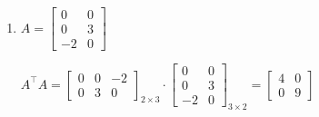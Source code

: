 \begin{enumerate}[label=\color{red}\textbf{\arabic*)}, leftmargin=*]
\begin{enumerate}[label=\color{red}\alph*)]
		$u_1=\dfrac{1}{\sigma_1}Av_1=\dfrac{1}{9}\begin{bmatrix}
			3 & 8\\
			0 & 3
		\end{bmatrix}\cdot\begin{bmatrix}
		\dfrac{1}{\sqrt{10}}\\
		\dfrac{3}{\sqrt{10}}
		\end{bmatrix}=\dfrac{1}{9\sqrt{10}}\cdot\begin{bmatrix}
		27\\
		9
		\end{bmatrix}=\dfrac{1}{\sqrt{10}}\begin{bmatrix}
		3\\
		1
		\end{bmatrix}$
		
		$u_2=\dfrac{1}{\sigma_2}Av_2=\dfrac{1}{\sqrt{10}}\begin{bmatrix}
			3 & 8\\
			0 & 3
		\end{bmatrix}\cdot\begin{bmatrix}
		-3\\
		1
		\end{bmatrix}=\dfrac{1}{\sqrt{10}}\cdot\begin{bmatrix}
		-1\\
		3
		\end{bmatrix}$
		
		$\bboxed{A=U\Sigma V^\intercal}$
	\end{enumerate}
	\item {}
	
	$A= \begin{bmatrix}
		0 & 0\\
		0 & 3\\
		-2 & 0
	\end{bmatrix}$
	
	$A^\intercal A=\begin{bmatrix}
		0 & 0 & -2\\
		0 & 3 & 0
	\end{bmatrix}_{2\times3}\cdot \begin{bmatrix}
	0 & 0\\
	0 & 3\\
	-2 & 0
	\end{bmatrix}_{3\times2}=\begin{bmatrix}
	4 & 0\\
	0 & 9
	\end{bmatrix}$
	

\end{enumerate}
